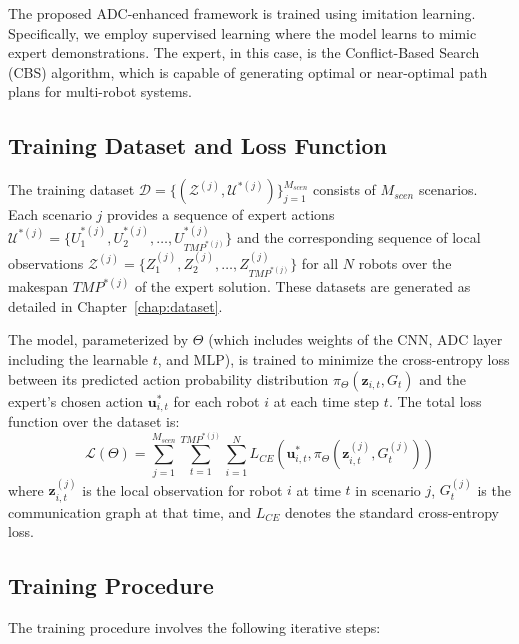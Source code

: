 The proposed ADC-enhanced framework is trained using imitation learning. Specifically, we employ supervised learning where the model learns to mimic expert demonstrations. The expert, in this case, is the Conflict-Based Search (CBS) algorithm, which is capable of generating optimal or near-optimal path plans for multi-robot systems.

\subsection{Training Dataset and Loss Function}

The training dataset $\mathcal{D} = \{(\mathcal{Z}^{(j)}, \mathcal{U}^{*(j)})\}_{j=1}^{M_{scen}}$ consists of $M_{scen}$ scenarios. Each scenario $j$ provides a sequence of expert actions $\mathcal{U}^{*(j)} = \{U_1^{*(j)}, U_2^{*(j)}, \dots, U_{TMP^{*(j)}}^{*(j)}\}$ and the corresponding sequence of local observations $\mathcal{Z}^{(j)} = \{Z_1^{(j)}, Z_2^{(j)}, \dots, Z_{TMP^{*(j)}}^{(j)}\}$ for all $N$ robots over the makespan $TMP^{*(j)}$ of the expert solution. These datasets are generated as detailed in Chapter~\ref{chap:dataset}.

The model, parameterized by $\Theta$ (which includes weights of the CNN, ADC layer including the learnable $t$, and MLP), is trained to minimize the cross-entropy loss between its predicted action probability distribution $\pi_{\Theta}(\mathbf{z}_{i,t}, G_t)$ and the expert's chosen action $\mathbf{u}^*_{i,t}$ for each robot $i$ at each time step $t$. The total loss function over the dataset is:
\begin{equation}
\mathcal{L}(\Theta) = \sum_{j=1}^{M_{scen}} \sum_{t=1}^{TMP^{*(j)}} \sum_{i=1}^{N} L_{CE}(\mathbf{u}^*_{i,t}, \pi_{\Theta}(\mathbf{z}_{i,t}^{(j)}, G_t^{(j)}))
\end{equation}
where $\mathbf{z}_{i,t}^{(j)}$ is the local observation for robot $i$ at time $t$ in scenario $j$, $G_t^{(j)}$ is the communication graph at that time, and $L_{CE}$ denotes the standard cross-entropy loss.

\subsection{Training Procedure}

The training procedure involves the following iterative steps:

